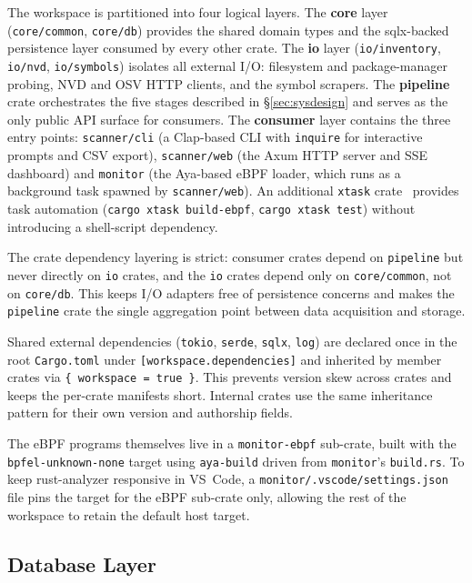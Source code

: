 \documentclass[conference]{IEEEtran}
\begin{document}
The workspace is partitioned into four logical layers. The \textbf{core} layer (\texttt{core/common}, \texttt{core/db}) provides the shared domain types and the sqlx-backed persistence layer consumed by every other crate. The \textbf{io} layer (\texttt{io/inventory}, \texttt{io/nvd}, \texttt{io/symbols}) isolates all external I/O: filesystem and package-manager probing, NVD and OSV HTTP clients, and the symbol scrapers. The \textbf{pipeline} crate orchestrates the five stages described in \S\ref{sec:sysdesign} and serves as the only public API surface for consumers. The \textbf{consumer} layer contains the three entry points: \texttt{scanner/cli} (a Clap-based CLI with \texttt{inquire} for interactive prompts and CSV export), \texttt{scanner/web} (the Axum HTTP server and SSE dashboard) and \texttt{monitor} (the Aya-based eBPF loader, which runs as a background task spawned by \texttt{scanner/web}). An additional \texttt{xtask} crate~\cite{xtask} provides task automation (\texttt{cargo xtask build-ebpf}, \texttt{cargo xtask test}) without introducing a shell-script dependency.

The crate dependency layering is strict: consumer crates depend on \texttt{pipeline} but never directly on \texttt{io} crates, and the \texttt{io} crates depend only on \texttt{core/common}, not on \texttt{core/db}. This keeps I/O adapters free of persistence concerns and makes the \texttt{pipeline} crate the single aggregation point between data acquisition and storage.

Shared external dependencies (\texttt{tokio}, \texttt{serde}, \texttt{sqlx}, \texttt{log}) are declared once in the root \texttt{Cargo.toml} under \texttt{[workspace.dependencies]} and inherited by member crates via \texttt{\{ workspace = true \}}. This prevents version skew across crates and keeps the per-crate manifests short. Internal crates use the same inheritance pattern for their own version and authorship fields.

The eBPF programs themselves live in a \texttt{monitor-ebpf} sub-crate, built with the \texttt{bpfel-unknown-none} target using \texttt{aya-build} driven from \texttt{monitor}'s \texttt{build.rs}. To keep rust-analyzer responsive in VS~Code, a \texttt{monitor/.vscode/settings.json} file pins the target for the eBPF sub-crate only, allowing the rest of the workspace to retain the default host target.

\subsection{Database Layer}
\label{sec:database}
\end{document}
